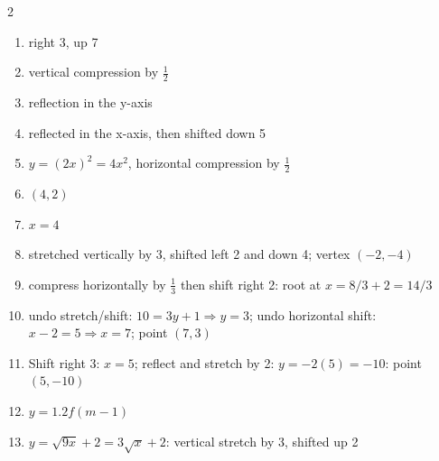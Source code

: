 \documentclass[11pt]{article}
\begin{document}
\begin{keybox}
\begin{multicols}{2}
\small
\begin{enumerate}[leftmargin=*,itemsep=3pt]
  \item right 3, up 7
  \item vertical compression by $\tfrac12$
  \item reflection in the y-axis
  \item reflected in the x-axis, then shifted down 5
  \item $y=(2x)^2=4x^2$, horizontal compression by $\tfrac12$
  \item $(4,2)$
  \item $x=4$
  \item stretched vertically by 3, shifted left 2 and down 4; vertex $(-2,-4)$
  \item compress horizontally by $\tfrac13$ then shift right 2: root at $x=8/3+2=14/3$
  \item undo stretch/shift: $10=3y+1\Rightarrow y=3$; undo horizontal shift: $x-2=5\Rightarrow x=7$; point $(7,3)$
  \item Shift right 3: $x=5$; reflect and stretch by 2: $y=-2(5)=-10$: point $(5,-10)$
  \item $y=1.2f(m-1)$
  \item $y=\sqrt{9x}+2=3\sqrt x+2$: vertical stretch by 3, shifted up 2
\end{enumerate}
\end{multicols}
\end{keybox}
\end{document}
